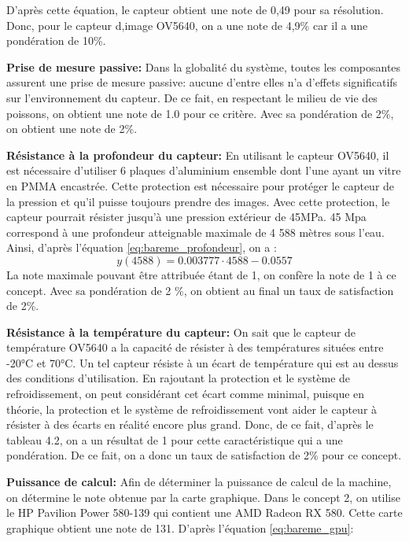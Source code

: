 D'après cette équation, le capteur obtient une note de 0,49 pour sa résolution. Donc, pour le capteur d,image OV5640, on a une note de 4,9\% car il a une pondération de 10\%.

\textbf{Prise de mesure passive:}
Dans la globalité du système, toutes les composantes assurent une prise de mesure passive: aucune d'entre elles n'a d'effets significatifs sur l'environnement du capteur. De ce fait, en respectant le milieu de vie des poissons, on obtient une note de 1.0 pour ce critère. Avec sa pondération de 2\%, on obtient une note de 2\%.

\textbf{Résistance à la profondeur du capteur:}	
En utilisant le capteur OV5640, il est nécessaire d'utiliser 6 plaques d'aluminium ensemble dont l'une ayant un vitre en PMMA encastrée. Cette protection est nécessaire pour protéger le capteur de la pression et qu'il puisse toujours prendre des images. Avec cette protection, le capteur pourrait résister jusqu'à une pression extérieur de 45MPa. 45 Mpa correspond à une profondeur atteignable maximale de 4 588 mètres sous l'eau. Ainsi, d'après l'équation \ref{eq:bareme_profondeur}, on a :
\begin{equation}
    y(4588) = 0.003777\cdot4588-0.0557
\end{equation}
La note maximale pouvant être attribuée étant de 1, on confère la note de 1 à ce concept. Avec sa pondération de 2 \%, on obtient au final un taux de satisfaction de 2\%.

\textbf{Résistance à la température du capteur:}
On sait que le capteur de température OV5640 a la capacité de résister à des températures situées entre -20°C et 70°C. Un tel capteur résiste à un écart de température qui est au dessus des conditions d'utilisation. En rajoutant la protection et le système de refroidissement, on peut considérant cet écart comme minimal, puisque en théorie, la protection et le système de refroidissement vont aider le capteur à résister à des écarts en réalité encore plus grand. Donc, de ce fait, d'après le tableau 4.2, on a un résultat de 1 pour cette caractéristique qui a une pondération. De ce fait, on a donc un taux de satisfaction de 2\% pour ce concept.  

\textbf{Puissance de calcul:}
Afin de déterminer la puissance de calcul de la machine, on détermine le note obtenue par la carte graphique. Dans le concept 2, on utilise le HP Pavilion Power 580-139 qui contient une AMD Radeon RX 580. Cette carte graphique obtient une note de 131. D'après l'équation \ref{eq:bareme_gpu}:

